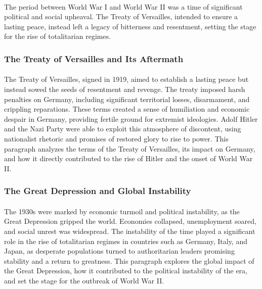 \documentclass[a4paper,12pt]{book}
\begin{document}
\paragraph{}
The period between World War I and World War II was a time of significant political and social upheaval. The Treaty of Versailles, intended to ensure a lasting peace, instead left a legacy of bitterness and resentment, setting the stage for the rise of totalitarian regimes.

\subsubsection*{The Treaty of Versailles and Its Aftermath}
\paragraph{}
The Treaty of Versailles, signed in 1919, aimed to establish a lasting peace but instead sowed the seeds of resentment and revenge. The treaty imposed harsh penalties on Germany, including significant territorial losses, disarmament, and crippling reparations. These terms created a sense of humiliation and economic despair in Germany, providing fertile ground for extremist ideologies. Adolf Hitler and the Nazi Party were able to exploit this atmosphere of discontent, using nationalist rhetoric and promises of restored glory to rise to power. This paragraph analyzes the terms of the Treaty of Versailles, its impact on Germany, and how it directly contributed to the rise of Hitler and the onset of World War II.

\subsubsection*{The Great Depression and Global Instability}
\paragraph{}
The 1930s were marked by economic turmoil and political instability, as the Great Depression gripped the world. Economies collapsed, unemployment soared, and social unrest was widespread. The instability of the time played a significant role in the rise of totalitarian regimes in countries such as Germany, Italy, and Japan, as desperate populations turned to authoritarian leaders promising stability and a return to greatness. This paragraph explores the global impact of the Great Depression, how it contributed to the political instability of the era, and set the stage for the outbreak of World War II.
\end{document}
